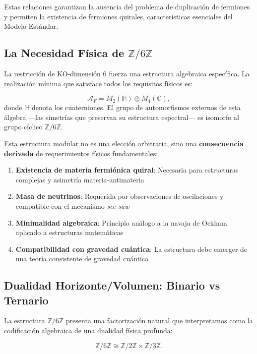 \documentclass[12pt, a4paper]{article}
\theoremstyle{plain}
\theoremstyle{definition}
\begin{document}
Estas relaciones garantizan la ausencia del problema de duplicación de fermiones y permiten la existencia de fermiones quirales, características esenciales del Modelo Estándar.

\subsection{La Necesidad Física de $\mathbb{Z}/6\mathbb{Z}$}

La restricción de KO-dimensión 6 fuerza una estructura algebraica específica. La realización mínima que satisface todos los requisitos físicos es:

\begin{equation}
\mathcal{A}_F = M_2(\mathbb{H}) \oplus M_4(\mathbb{C}),
\end{equation}
donde $\mathbb{H}$ denota los cuaterniones. El grupo de automorfismos externos de esta álgebra —las simetrías que preservan su estructura espectral— es isomorfo al grupo cíclico $\mathbb{Z}/6\mathbb{Z}$.

Esta estructura modular no es una elección arbitraria, sino una \textbf{consecuencia derivada} de requerimientos físicos fundamentales:

\begin{enumerate}
    \item \textbf{Existencia de materia fermiónica quiral}: Necesaria para estructuras complejas y asimetría materia-antimateria
    \item \textbf{Masa de neutrinos}: Requerida por observaciones de oscilaciones y compatible con el mecanismo \textit{see-saw}
    \item \textbf{Minimalidad algebraica}: Principio análogo a la navaja de Ockham aplicado a estructuras matemáticas
    \item \textbf{Compatibilidad con gravedad cuántica}: La estructura debe emerger de una teoría consistente de gravedad cuántica
\end{enumerate}

\subsection{Dualidad Horizonte/Volumen: Binario vs Ternario}

La estructura $\mathbb{Z}/6\mathbb{Z}$ presenta una factorización natural que interpretamos como la codificación algebraica de una dualidad física profunda:

\begin{equation}
\mathbb{Z}/6\mathbb{Z} \cong \mathbb{Z}/2\mathbb{Z} \times \mathbb{Z}/3\mathbb{Z}.
\label{eq:factorization}
\end{equation}
\end{document}

